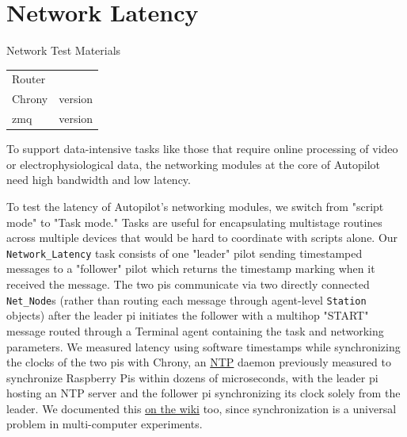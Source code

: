 
\section{Network Latency}
\label{sec:networklatency}


\begin{margintable}[-0.5cm]
\caption{Network Test Materials}
\label{tab:materials}
\noindent\begin{tabularx}{\linewidth}{lX}%
\toprule
Router & \\
Chrony & version \\
zmq & version \\
\bottomrule
\end{tabularx}
\end{margintable}

To support data-intensive tasks like those that require online processing of video or electrophysiological data, the networking modules at the core of Autopilot need high bandwidth and low latency. 

To test the latency of Autopilot's networking modules, we switch from "script mode" to "Task mode." Tasks are useful for encapsulating multistage routines across multiple devices that would be hard to coordinate with scripts alone. Our \texttt{Network\_Latency} task consists of one "leader" pilot sending timestamped messages to a "follower" pilot which returns the timestamp marking when it received the message. The two pis communicate via two directly connected \texttt{Net\_Node}s (rather than routing each message through agent-level \texttt{Station} objects) after the leader pi initiates the follower with a multihop "START" message routed through a Terminal agent containing the task and networking parameters. We measured latency using software timestamps while synchronizing the clocks of the two pis with Chrony, an \href{https://en.wikipedia.org/wiki/Network\_Time\_Protocol}{NTP} daemon previously measured to synchronize Raspberry Pis within dozens of microseconds\citep{soaresAnalysisTimekeepingExperimentation2020}, with the leader pi hosting an NTP server and the follower pi synchronizing its clock solely from the leader. We documented this \href{https://wiki.auto-pi-lot.com/index.php/NTP}{on the wiki} too, since synchronization is a universal problem in multi-computer experiments.

